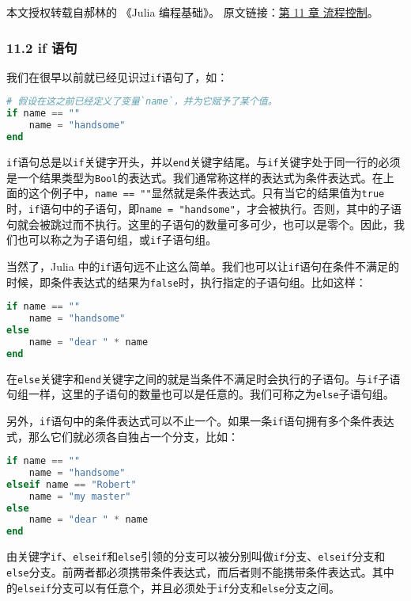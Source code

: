 
本文授权转载自郝林的 《Julia 编程基础》。 原文链接：\href{https://github.com/hyper0x/JuliaBasics/blob/master/book/ch11.md}{第 11 章 流程控制}。

\subsubsection{11.2 if 语句}

我们在很早以前就已经见识过\verb|if|语句了，如：

\begin{lstlisting}[language=julia]
# 假设在这之前已经定义了变量`name`，并为它赋予了某个值。
if name == "" 
    name = "handsome" 
end
\end{lstlisting}

\verb|if|语句总是以\verb|if|关键字开头，并以\verb|end|关键字结尾。与\verb|if|关键字处于同一行的必须是一个结果类型为\verb|Bool|的表达式。我们通常称这样的表达式为条件表达式。在上面的这个例子中，\verb|name == ""|显然就是条件表达式。只有当它的结果值为\verb|true|时，\verb|if|语句中的子语句，即\verb|name = "handsome"|，才会被执行。否则，其中的子语句就会被跳过而不执行。这里的子语句的数量可多可少，也可以是零个。因此，我们也可以称之为子语句组，或\verb|if|子语句组。

当然了，Julia 中的\verb|if|语句远不止这么简单。我们也可以让\verb|if|语句在条件不满足的时候，即条件表达式的结果为\verb|false|时，执行指定的子语句组。比如这样：

\begin{lstlisting}[language=julia]
if name == "" 
    name = "handsome" 
else 
    name = "dear " * name
end
\end{lstlisting}

在\verb|else|关键字和\verb|end|关键字之间的就是当条件不满足时会执行的子语句。与\verb|if|子语句组一样，这里的子语句的数量也可以是任意的。我们可称之为\verb|else|子语句组。

另外，\verb|if|语句中的条件表达式可以不止一个。如果一条\verb|if|语句拥有多个条件表达式，那么它们就必须各自独占一个分支，比如：

\begin{lstlisting}[language=julia]
if name == ""
    name = "handsome"
elseif name == "Robert"
    name = "my master"
else
    name = "dear " * name
end
\end{lstlisting}

由关键字\verb|if|、\verb|elseif|和\verb|else|引领的分支可以被分别叫做\verb|if|分支、\verb|elseif|分支和\verb|else|分支。前两者都必须携带条件表达式，而后者则不能携带条件表达式。其中的\verb|elseif|分支可以有任意个，并且必须处于\verb|if|分支和\verb|else|分支之间。

